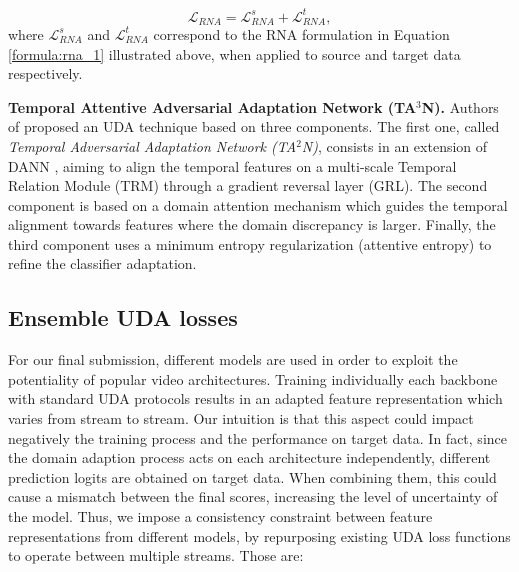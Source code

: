 \begin{equation}\label{eq:loss_s_t}
    \mathcal{L}_{RNA}=\mathcal{L}^s_{RNA}+\mathcal{L}^t_{RNA} ,
\end{equation}
where $\mathcal{L}^s_{RNA}$ and $\mathcal{L}^t_{RNA}$ correspond to the RNA formulation in Equation \ref{formula:rna_1} illustrated above, when applied to source and target data respectively.

\textbf{Temporal Attentive Adversarial Adaptation Network (TA$^3$N).} Authors of \cite{videoda-chen2019temporal} proposed an UDA technique based on three components. The first one,  called \textit{Temporal Adversarial Adaptation Network (TA$^2$N)}, consists in an extension of DANN \cite{grl-pmlr-v37-ganin15}, %
aiming to align the temporal features on a multi-scale Temporal Relation Module (TRM) \cite{zhou2018temporal} through a gradient reversal layer (GRL).
The second component is based on a domain attention mechanism which guides the temporal alignment towards features where the domain discrepancy is larger.
Finally, the third component uses a minimum entropy regularization (attentive entropy) to
refine the classifier adaptation.





\subsection{Ensemble UDA losses}

For our final submission, different models are used in order to exploit the potentiality of popular video architectures. 
Training individually each backbone with standard UDA protocols results in an adapted feature representation which varies from stream to stream. Our intuition is that this aspect could impact negatively the training process and the performance on target data. %
In fact, since the domain adaption process acts on each architecture independently, different prediction logits are obtained on target data. When combining them, this could cause a mismatch between the final scores, increasing the level of uncertainty of the model.
Thus, we impose a consistency constraint between feature representations from different models, by repurposing existing UDA loss functions to operate between multiple streams. Those are:


